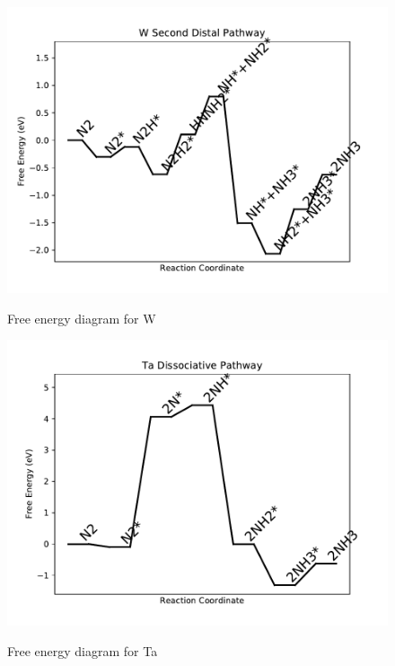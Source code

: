 \documentclass{article}
\begin{document}
\begin{figure}
\includegraphics[width=1\linewidth]{data/plots/W_distal_2.pdf}
\label{fig:W_distal_2}
\caption{Free energy diagram for W}
\end{figure}

\begin{figure}
\includegraphics[width=1\linewidth]{data/plots/Ta_dissociative.pdf}
\label{fig:Ta_dissociative}
\caption{Free energy diagram for Ta}
\end{figure}
\end{document}
